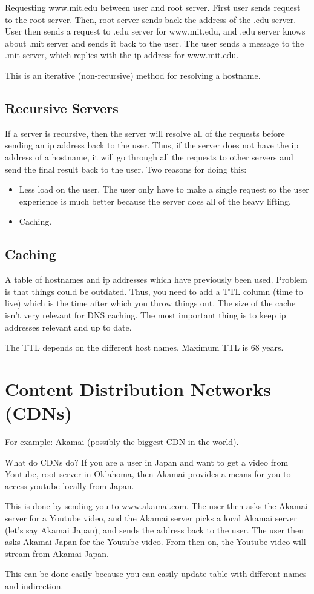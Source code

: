 \documentclass[psamsfonts]{amsart}
\begin{document}
Requesting www.mit.edu between user and root server. First user sends request to the root server. Then, root server sends back the address of the .edu server. User then sends a request to .edu server for www.mit.edu, and .edu server knows about .mit server and sends it back to the user. The user sends a message to the .mit server, which replies with the ip address for www.mit.edu.

This is an iterative (non-recursive) method for resolving a hostname.

\subsection{Recursive Servers}

If a server is recursive, then the server will resolve all of the requests before sending an ip address back to the user. Thus, if the server does not have the ip address of a hostname, it will go through all the requests to other servers and send the final result back to the user. Two reasons for doing this:

\begin{itemize}
  \item Less load on the user. The user only have to make a single request so the user experience is much better because the server does all of the heavy lifting.
  \item Caching.
\end{itemize}

\subsection{Caching}

A table of hostnames and ip addresses which have previously been used. Problem is that things could be outdated. Thus, you need to add a TTL column (time to live) which is the time after which you throw things out. The size of the cache isn't very relevant for DNS caching. The most important thing is to keep ip addresses relevant and up to date.

The TTL depends on the different host names. Maximum TTL is 68 years.

\section{Content Distribution Networks (CDNs)}

For example: Akamai (possibly the biggest CDN in the world).

What do CDNs do? If you are a user in Japan and want to get a video from Youtube, root server in Oklahoma, then Akamai provides a means for you to access youtube locally from Japan. 

This is done by sending you to www.akamai.com. The user then asks the Akamai server for a Youtube video, and the Akamai server picks a local Akamai server (let's say Akamai Japan), and sends the address back to the user. The user then asks Akamai Japan for the Youtube video. From then on, the Youtube video will stream from Akamai Japan.

This can be done easily because you can easily update table with different names and indirection.
\end{document}
